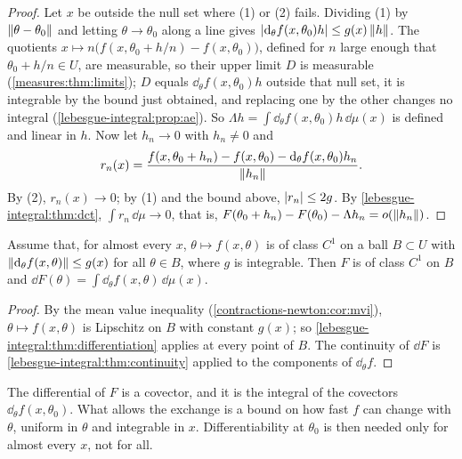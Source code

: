 \begin{notechapter}
\begin{proof}
Let $x$ be outside the null set where (1) or (2) fails. Dividing (1) by
$\left\|\theta - \theta_0\right\|$ and letting $\theta\to\theta_0$ along a line
gives $\left|\mathrm{d}_\theta f(x, \theta_0)h\right|\leq g(x)\left\|h\right\|$. The
quotients $x\mapsto n\bigl(f(x, \theta_0 + h/n) - f(x, \theta_0)\bigr)$,
defined for $n$ large enough that $\theta_0 + h/n\in U$, are
measurable, so their upper limit $D$ is measurable
(\cref{measures:thm:limits}); $D$ equals $\dd_\theta f(x, \theta_0)h$
outside that null set, it is integrable by the bound just obtained,
and replacing one by the other changes no integral
(\cref{lebesgue-integral:prop:ae}). So
$\Lambda h = \int\dd_\theta f(x, \theta_0)h\,\dd\mu(x)$ is defined and
linear in $h$. Now let $h_n\to0$ with $h_n\neq0$ and
\[
  r_n(x) = \frac{f(x, \theta_0 + h_n) - f(x, \theta_0)
           - \mathrm{d}_\theta f(x, \theta_0)h_n}{\left\|h_n\right\|} .
\]
By (2), $r_n(x)\to0$; by (1) and the bound above,
$\left|r_n\right|\leq2g$. By \cref{lebesgue-integral:thm:dct},
$\int r_n\,\dd\mu\to0$, that is,
$F(\theta_0 + h_n) - F(\theta_0) - \Lambda h_n = o(\left\|h_n\right\|)$.
\end{proof}

\begin{corollary}\label{lebesgue-integral:cor:c1}
Assume that, for almost every $x$, $\theta\mapsto f(x, \theta)$ is of
class $C^1$ on a ball $B\subset U$ with
$\left\|\mathrm{d}_\theta f(x, \theta)\right\|\leq g(x)$ for all $\theta\in B$, where
$g$ is integrable. Then $F$ is of class $C^1$ on $B$ and
$\dd F(\theta) = \int\dd_\theta f(x, \theta)\,\dd\mu(x)$.
\end{corollary}

\begin{proof}
By the mean value inequality (\cref{contractions-newton:cor:mvi}),
$\theta\mapsto f(x, \theta)$ is Lipschitz on $B$ with constant $g(x)$;
so \cref{lebesgue-integral:thm:differentiation} applies at every point
of $B$. The continuity of $\dd F$ is
\cref{lebesgue-integral:thm:continuity} applied to the components of
$\dd_\theta f$.
\end{proof}

\begin{intuition}
The differential of $F$ is a covector, and it is the integral of the
covectors $\dd_\theta f(x, \theta_0)$. What allows the exchange is a
bound on how fast $f$ can change with $\theta$, uniform in $\theta$ and
integrable in $x$. Differentiability at $\theta_0$ is then needed only
for almost every $x$, not for all.
\end{intuition}


\end{notechapter}
